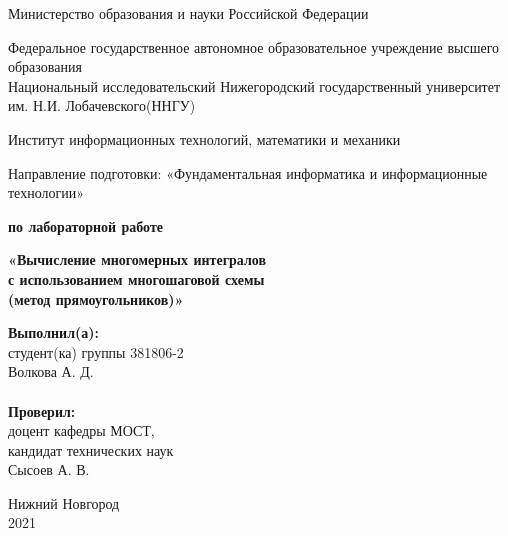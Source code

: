 \documentclass{report}
\begin{document}
\begin{titlepage}

\begin{center}
Министерство образования и науки Российской Федерации
\end{center}

\begin{center}
Федеральное государственное автономное образовательное учреждение высшего образования \\
Национальный исследовательский Нижегородский государственный университет им. Н.И. Лобачевского(ННГУ)
\end{center}
\begin{center}
Институт информационных технологий, математики и механики
\end{center}
\begin{center}
Направление подготовки: «Фундаментальная информатика и информационные технологии»
\end{center}

\vspace{2em}

\begin{center}
\textbf{ по лабораторной работе} 
\end{center}
\begin{center}
\textbf{\Large«Вычисление многомерных интегралов \\
с использованием многошаговой схемы \\
(метод прямоугольников)»} \\
\end{center}

\vspace{4em}

\newbox{\lbox}
\newlength{\maxl}
\setlength{\maxl}{\wd\lbox}
\hfill\parbox{7cm}{
\textbf{Выполнил(а):} \\ студент(ка) группы 381806-2 \\ Волкова А. Д.\\
\\
\textbf{Проверил:}\\ доцент кафедры МОСТ, \\ кандидат технических наук \\ Сысоев А. В.\\
}

\vspace{\fill}

\begin{center} Нижний Новгород \\ 2021 \end{center}

\end{titlepage}
\end{document}
